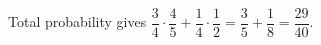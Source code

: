 Total probability gives $\dfrac{3}{4}\cdot\dfrac{4}{5}+\dfrac{1}{4}\cdot\dfrac{1}{2}=\dfrac{3}{5}+\dfrac{1}{8}=\boxed{\dfrac{29}{40}}$.
